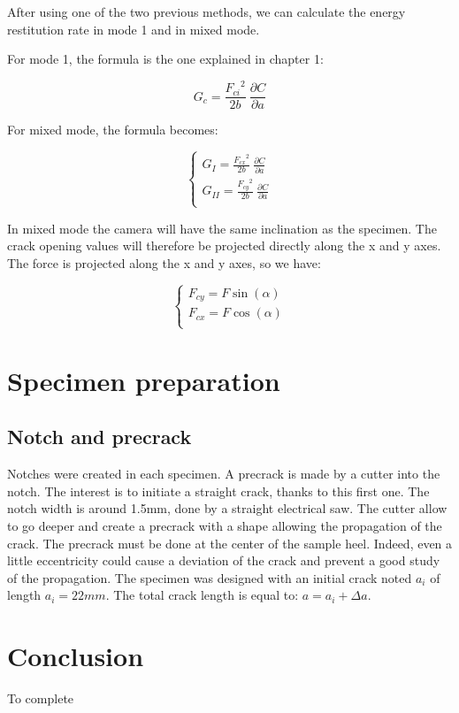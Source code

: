 After using one of the two previous methods, we can calculate the energy restitution rate in mode 1 and in mixed mode.

For mode 1, the formula is the one explained in chapter 1:

\begin{equation}
	G_c=\frac{{F_{ci}}^2}{2b}\ \frac{\partial C}{\partial a}
\end{equation}

For mixed mode, the formula becomes:

\begin{equation}
	\begin{cases}
		G_I=\frac{{F_{cx}}^2}{2b}\ \frac{\partial C}{\partial a} \\
		G_{II}=\frac{{F_{cy}}^2}{2b}\ \frac{\partial C}{\partial a}\\ 
	\end{cases}
\end{equation}

In mixed mode the camera will have the same inclination as the specimen. The crack opening values will therefore be projected directly along the x and y axes. The force is projected along the x and y axes, so we have:

\begin{equation}
	\begin{cases}
		F_{cy}=F \sin(\alpha) \\
		F_{cx}=F \cos(\alpha) \\ 
	\end{cases}
\end{equation}

\section{Specimen preparation}

\subsection{Notch and precrack}

Notches were created in each specimen. A precrack is made by a cutter into the notch. The interest is to initiate a straight crack, thanks to this first one. The notch width is around 1.5mm, done by a straight electrical saw. The cutter allow to go deeper and create a precrack with a shape allowing the propagation of the crack. The precrack must be done at the center of the sample heel. Indeed, even a little eccentricity could cause a deviation of the crack and prevent a good study of the propagation. The specimen was designed with an initial crack noted $a_i$ of length  $a_i=22mm$. The total crack length is equal to: $a=a_i+\Delta a$.


\section{Conclusion}

To complete


